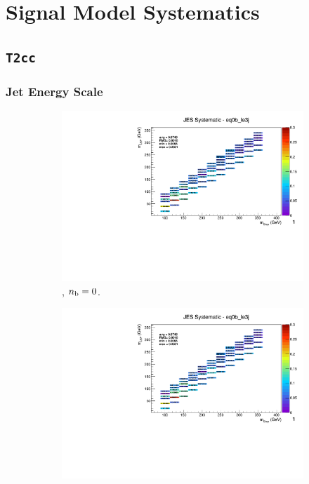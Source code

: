 \chapter{Signal Model Systematics}
\label{ch:app_sig_syst}

\section*{\texttt{T2cc}}
\label{sec:t2cc_syst_plots}

\newpage
\subsection*{Jet Energy Scale}
\label{sec:t2cc_jes_plots}

\begin{figure}[ht!]
  \centering
  \begin{subfigure}[b]{0.32\textwidth}
    \includegraphics[width=\textwidth, page=12]{Figs/sms/t2cc/v37/systs/T2cc_JES_eq0b_le3j.pdf}
    \caption{\njlow, $n_{\text{b}} = 0$.}
  \end{subfigure}
  \begin{subfigure}[b]{0.32\textwidth}
    \includegraphics[width=\textwidth, page=8]{Figs/sms/t2cc/v37/systs/T2cc_JES_eq0b_le3j.pdf}

\end{subfigure}
\end{figure}
